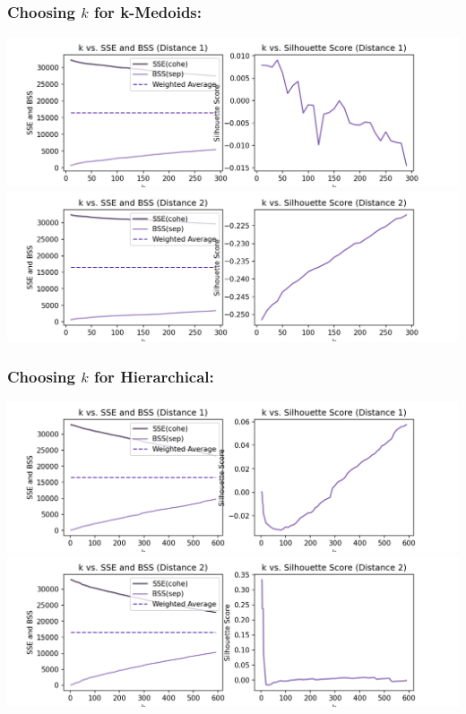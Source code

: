 \documentclass[fleqn]{article}
\begin{document}
\subsubsection{Choosing $k$ for k-Medoids:}
\begin{center}
	\includegraphics[scale=0.40]{images/d1_ks.png}
	\includegraphics[scale=0.40]{images/d2_ks.png}
\end{center}

\subsubsection{Choosing $k$ for Hierarchical:}
\begin{center}
	\includegraphics[scale=0.40]{images/d1_f_ks.png}\includegraphics[scale=0.40]{images/d2_f_ks.png}
\end{center}
\end{document}
